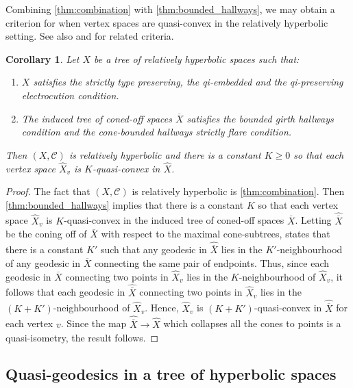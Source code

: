 \documentclass[11pt, a4paper]{amsart}
\newtheorem{corollary}[theorem]{Corollary}
\theoremstyle{definition}
\newcommand{\wh}[1]{\widehat{ #1 }}
\begin{document}
Combining \cref{thm:combination} with \cref{thm:bounded_hallways}, we may obtain a criterion for when vertex spaces are quasi-convex in the relatively hyperbolic setting. See also \cite{KS24} and \cite{To25} for related criteria.


\begin{corollary}
\label{cor:bounded_hallways}
Let $X$ be a tree of relatively hyperbolic spaces such that:
\begin{enumerate}
\item $X$ satisfies the strictly type preserving, the qi-embedded and the qi-preserving electrocution condition.
\item The induced tree of coned-off spaces $\overline{X}$ satisfies the bounded girth hallways condition and the cone-bounded hallways strictly flare condition.
\end{enumerate}
Then $(X, \mathcal{C})$ is relatively hyperbolic and there is a constant $K\geqslant 0$ so that each vertex space $\wh{X}_v$ is $K$-quasi-convex in $\wh{X}$.
\end{corollary}

\begin{proof}
The fact that $(X, \mathcal{C})$ is relatively hyperbolic is \cref{thm:combination}. Then \cref{thm:bounded_hallways} implies that there is a constant $K$ so that each vertex space $\wh{X}_v$ is $K$-quasi-convex in the induced tree of coned-off spaces $\overline{X}$. Letting $\wh{\overline{X}}$ be the coning off of $\overline{X}$ with respect to the maximal cone-subtrees, \cite[Lemma 2.4]{MR08} states that there is a constant $K'$ such that any geodesic in $\wh{\overline{X}}$ lies in the $K'$-neighbourhood of any geodesic in $\overline{X}$ connecting the same pair of endpoints. Thus, since each geodesic in $\overline{X}$ connecting two points in $\wh{X}_v$ lies in the $K$-neighbourhood of $\wh{X}_v$, it follows that each geodesic in $\wh{\overline{X}}$ connecting two points in $\wh{X}_v$ lies in the $(K+K')$-neighbourhood of $\wh{X}_v$. Hence, $\wh{X}_v$ is $(K+K')$-quasi-convex in $\wh{\overline{X}}$ for each vertex $v$. Since the map $\wh{\overline{X}}\to\wh{X}$ which collapses all the cones to points is a quasi-isometry, the result follows.
\end{proof}


\subsection{Quasi-geodesics in a tree of hyperbolic spaces}
\label{sec:quasi-geodesics}
\end{document}

